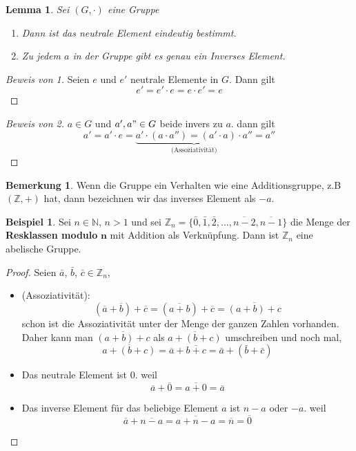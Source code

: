 \documentclass{article}
\theoremstyle{definition}
\newtheorem{bem}[definition]{Bemerkung}
\newtheorem*{bei*}{Beispiel}
\theoremstyle{plain}
\newtheorem{lem}[definition]{Lemma}
\begin{document}
\begin{lem}
	Sei $ (G , \cdot) $ eine Gruppe
	\begin{enumerate}
		\item Dann ist das neutrale Element eindeutig bestimmt. 
		\item Zu jedem $ a $ in der Gruppe gibt es genau ein Inverses Element.
	\end{enumerate}
\end{lem}
\begin{proof}[Beweis von 1]
	Seien $ e $ und $ e' $ neutrale Elemente in $ G $. Dann gilt
	\[ 
	e' = e' \cdot e = e \cdot e' = e
	 \]
\end{proof}
\begin{proof}[Beweis von 2]
	$ a \in G $ und $ a',a" \in G $ beide invers zu $ a $. dann gilt
	\[ 
	a' = a' \cdot e = \underbrace{a' \cdot (a \cdot a'') = (a' \cdot a) \cdot a''}_{\text{(Assoziativit\"at)}} = a''
	 \]
\end{proof}
\begin{bem}
	Wenn die Gruppe ein Verhalten wie eine Additionsgruppe, z.B $ (\mathbb{Z} , +) $ hat, dann bezeichnen wir das inverses Element als $ -a $.
\end{bem}
\begin{bei*}
	Sei $ n \in \mathbb{N} $, $ n > 1 $ und sei $ \mathbb{Z}_n = \{ \bar{0}, \bar{1}, \bar{2}, \ldots , \overline{n-2}, \overline{n-1} \} $ die Menge der \textbf{Resklassen modulo} $ \mathbf{n} $ mit Addition als Verkn\"upfung. Dann ist $ \mathbb{Z}_n $ eine abelische Gruppe.
\end{bei*}
\begin{proof}
	Seien $ \bar{a}$, $\bar{b}$, $\bar{c} \in \mathbb{Z}_n$,
	\begin{itemize}
		\item (Assoziativit\"at): 
		\[ 
		(\overline{a} + \overline{b}) + \overline{c} = (\overline{a + b}) + \overline{c}
		= \overline{(a + b) + c}
		 \]
		schon ist die Assoziativit\"at unter der Menge der ganzen Zahlen vorhanden. Daher kann man 
		$ \overline{(a + b) + c} $ als $ \overline{a + (b + c)} $ umschreiben und noch mal, 
		\[ 
		\overline{a + (b + c)} = \overline{a} + \overline{b+c} = \bar{a} + (\bar{b} + \bar{c})
		 \]
		\item 
		Das neutrale Element ist $ 0 $. weil
		\[ 
		\overline{a} + \overline{0} = \overline{a+0} = \overline{a}
		 \]
		\item 
		Das inverse Element f\"ur das beliebige Element $ a $ ist $ n-a $ oder $ -a $. weil
		\[ 
		\overline{a} + \overline{n-a} = \overline{a + n -a} = \overline{n} = \overline{0}
		 \]
	\end{itemize} 
\end{proof}
\end{document}
